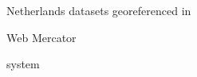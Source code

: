 \documentclass[c]{beamer}
\begin{document}
\begin{frame}
\begin{itemize}
{\begin{columns}
\begin{column}{0.33\textwidth}
\begin{overlayarea}{\linewidth}{3cm}
  \end{overlayarea}
  \begin{overlayarea}{\linewidth}{1cm}
    \centering
    \tiny Netherlands datasets georeferenced in \begin{itshape}Web Mercator\end{itshape} system\par
  \end{overlayarea}
  \end{column}
 \end{columns}
}
\end{itemize}

\end{frame}

% 
\end{document}
